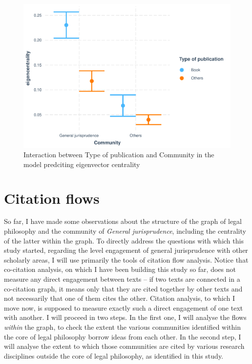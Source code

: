\documentclass[
]{article}
\begin{document}
\begin{figure}
\centering
\includegraphics{paper_files/figure-latex/inter2-1.pdf}
\caption{\label{fig:inter2}Interaction between Type of publication and Community in the model predciting eigenvector centrality}
\end{figure}

\hypertarget{citation-flows}{%
\section{Citation flows}\label{citation-flows}}

So far, I have made some observations about the structure of the graph of legal philosophy and the community of \emph{General jurisprudence}, including the centrality of the latter within the graph. To directly address the questions with which this study started, regarding the level engagement of general jurisprudence with other scholarly areas, I will use primarily the tools of citation flow analysis. Notice that co-citation analysis, on which I have been building this study so far, does not measure any direct engagement between texts -- if two texts are connected in a co-citation graph, it means only that they are cited together by other texts and not necessarily that one of them cites the other. Citation analysis, to which I move now, is supposed to measure exactly such a direct engagement of one text with another. I will proceed in two steps. In the first one, I will analyse the flows \emph{within} the graph, to check the extent the various communities identified within the core of legal philosophy borrow ideas from each other. In the second step, I will analyse the extent to which those communities are cited by various research disciplines outside the core of legal philosophy, as identified in this study.
\end{document}
